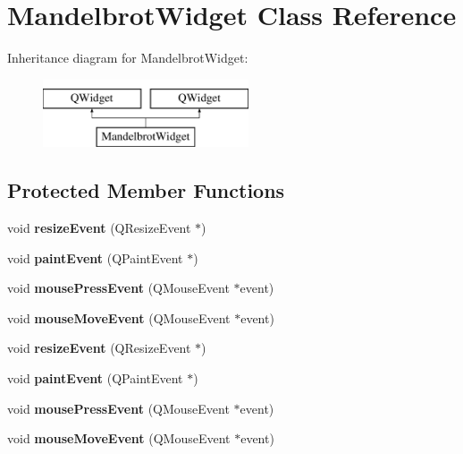 \hypertarget{class_mandelbrot_widget}{}\section{Mandelbrot\+Widget Class Reference}
\label{class_mandelbrot_widget}
Inheritance diagram for Mandelbrot\+Widget\+:\begin{figure}[H]
\begin{center}
\leavevmode
\includegraphics[height=2.000000cm]{class_mandelbrot_widget}
\end{center}
\end{figure}
\subsection*{Protected Member Functions}
\begin{DoxyCompactItemize}
\item 
\mbox{\label{class_mandelbrot_widget_a8f649050e2e279e53b58b49d6d4c428d}} 
void {\bfseries resize\+Event} (Q\+Resize\+Event $\ast$)
\item 
\mbox{\label{class_mandelbrot_widget_a6ecbf356d445fb4c3e42cd3a65945630}} 
void {\bfseries paint\+Event} (Q\+Paint\+Event $\ast$)
\item 
\mbox{\label{class_mandelbrot_widget_a8a76969f2198787b0a1cddef0e0c4b4e}} 
void {\bfseries mouse\+Press\+Event} (Q\+Mouse\+Event $\ast$event)
\item 
\mbox{\label{class_mandelbrot_widget_a3e1c70630eedc31d8111f98cebedfb8e}} 
void {\bfseries mouse\+Move\+Event} (Q\+Mouse\+Event $\ast$event)
\item 
\mbox{\label{class_mandelbrot_widget_a8f649050e2e279e53b58b49d6d4c428d}} 
void {\bfseries resize\+Event} (Q\+Resize\+Event $\ast$)
\item 
\mbox{\label{class_mandelbrot_widget_a6ecbf356d445fb4c3e42cd3a65945630}} 
void {\bfseries paint\+Event} (Q\+Paint\+Event $\ast$)
\item 
\mbox{\label{class_mandelbrot_widget_a8a76969f2198787b0a1cddef0e0c4b4e}} 
void {\bfseries mouse\+Press\+Event} (Q\+Mouse\+Event $\ast$event)
\item 
\mbox{\label{class_mandelbrot_widget_a3e1c70630eedc31d8111f98cebedfb8e}} 
void {\bfseries mouse\+Move\+Event} (Q\+Mouse\+Event $\ast$event)
\end{DoxyCompactItemize}
